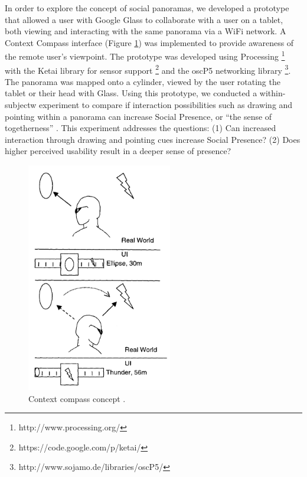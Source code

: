 In order to explore the concept of social panoramas, we developed a prototype that allowed a user with Google Glass to collaborate with a user on a tablet, both viewing and interacting with the same panorama via a WiFi network. A Context Compass interface \cite{Suomela2000} (Figure \ref{fig:ismar14:context-compass}) was implemented to provide awareness of the remote user's viewpoint. The prototype was developed using Processing \footnote{http://www.processing.org/} with the Ketai library for sensor support \footnote{https://code.google.com/p/ketai/} and the oscP5 networking library \footnote{http://www.sojamo.de/libraries/oscP5/}. The panorama was mapped onto a cylinder, viewed by the user rotating the tablet or their head with Glass. Using this prototype, we conducted a within-subjectw experiment to compare if interaction possibilities such as drawing and pointing within a panorama can increase Social Presence, or “the sense of togetherness” \cite{Basdogan2001}. This experiment addresses the questions: (1) Can increased interaction through drawing and pointing cues increase Social Presence? (2) Does higher perceived usability result in a deeper sense of presence? 

\begin{figure}[ht]
	\centering
	\includegraphics[width=2.5in]{images/ismar14/context-compass.PNG}
	\caption{Context compass concept \cite{Suomela2000}.}
	\label{fig:ismar14:context-compass}
\end{figure}


